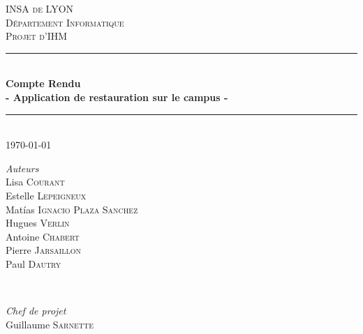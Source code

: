 \documentclass[12pt]{article}
\begin{document}
\begin{titlepage}

\newcommand{\HRule}{\rule{\linewidth}{0.5mm}} %

\center %
 

\vspace*{1cm}

\textsc{\LARGE INSA de LYON}\\[1.5cm] 
\textsc{\Large D\'epartement Informatique}\\[0.5cm] 
\textsc{\large Projet d'IHM}\\[0.5cm] %


\HRule \\[0.4cm]
{ \huge \bfseries Compte Rendu}\\[0.1cm]
{\large \bfseries - Application de restauration sur le campus -} 
\HRule \\[1.5cm]
 

{\large \today}\\[2cm] %
 

\begin{minipage}{0.5\textwidth}
\begin{center} \large
\emph{Auteurs} \\
Lisa \textsc{Courant} \\
Estelle \textsc{Lepeigneux} \\
Mat\'ias \textsc{Ignacio Plaza Sanchez} \\
Hugues \textsc{Verlin} \\
Antoine \textsc{Chabert} \\
Pierre \textsc{Jarsaillon} \\
Paul \textsc{Dautry} \\
\end{center}
\end{minipage}
~
\begin{minipage}{0.4\textwidth}
\begin{center} \large
\emph{Chef de projet} \\
Guillaume \textsc{Sarnette}
\end{center}
\end{minipage}\\[5cm]


\end{titlepage}
\end{document}
